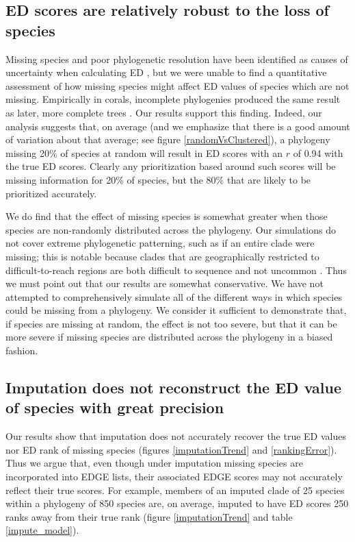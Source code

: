 \documentclass[12pt,english]{article}
\begin{document}
\subsection*{ED scores are relatively robust to the loss of species}
Missing species and poor phylogenetic resolution have been identified as causes
of uncertainty when calculating ED \autocite{Isaac2007}, but we were unable to
find a quantitative assessment of how missing species might affect ED values of
species which are not missing. Empirically in corals, incomplete phylogenies
produced the same result as later, more complete trees \autocite{Curnick2015}.
Our results support this finding.
Indeed, our analysis suggests that, on average (and we emphasize that
there is a good amount of variation about that average; see figure
\ref{randomVsClustered}), a phylogeny missing 20\% of species at
random will result in ED scores with an $r$ of 0.94 with the true ED
scores. Clearly any prioritization based around such scores will be
missing information for 20\% of species, but the 80\% that are likely
to be prioritized accurately.

We do find that the effect of missing species is somewhat greater when those species
are non-randomly distributed across the phylogeny. Our simulations do not cover extreme
phylogenetic patterning, such as if an entire clade were missing; this is notable because  clades that are
geographically restricted to difficult-to-reach regions are both
difficult to sequence and not uncommon \autocite[see][for an example involving 27 coral species in the Indian Ocean]{Arrigoni2012}. Thus we must point out that our results are somewhat conservative. We have not attempted to comprehensively
simulate all of the different ways in which species could be missing from a
phylogeny. We consider it sufficient to demonstrate that, if species are missing
at random, the effect is not too severe, but that it can be more severe if
missing species are distributed across the phylogeny in a biased fashion.

\subsection*{Imputation does not reconstruct the ED value of species with great precision}
Our results show that imputation does not accurately recover the true ED values
nor ED rank of missing species (figures \ref{imputationTrend} and \ref{rankingError}). Thus we argue that, even though under imputation missing
species are incorporated into EDGE lists, their associated EDGE scores may not
accurately reflect their true scores. For example, members of an imputed clade of 25
species within a phylogeny of 850 species are, on average, imputed to have ED
scores 250 ranks away from their true rank (figure \ref{imputationTrend} and table
\ref{impute_model}).
\end{document}
